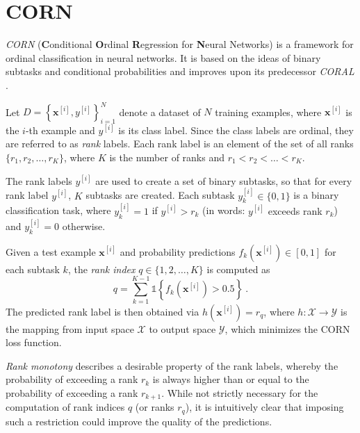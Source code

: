\section{CORN}
\emph{CORN} (\textbf{C}onditional \textbf{O}rdinal \textbf{R}egression for \textbf{N}eural Networks) \cite{corn}
is a framework for ordinal classification in neural networks.
It is based on the ideas of binary subtasks and conditional probabilities
and improves upon its predecessor \emph{CORAL} \cite{coral}.



Let $D = \left\{ \mathbf{x}^{[i]}, y^{[i]} \right\}_{i=1}^N$ denote a dataset of $N$ training examples,
where $\mathbf{x}^{[i]}$ is the $i$-th example and $y^{[i]}$ is its class label.
Since the class labels are ordinal, they are referred to as \emph{rank} labels.
Each rank label is an element of the set of all ranks $\{r_1, r_2, \ldots, r_K\}$,
  where
  $K$ is the number of ranks
  and $r_1 < r_2 < \ldots < r_K$.

The rank labels $y^{[i]}$ are used to create a set of binary subtasks,
so that for every rank label $y^{[i]}$,
$K$ subtasks are created.
Each subtask $y^{[i]}_k \in \{0, 1\}$ is a binary classification task,
  where
    $y^{[i]}_k = 1$ if $y^{[i]} > r_k$ (in words: {$y^{[i]}$ exceeds rank $r_k$})
    and $y^{[i]}_k = 0$ otherwise.

Given a test example $\mathbf{x}^{[i]}$
and probability predictions $f_k(\mathbf{x}^{[i]}) \in [0,1]$ for each subtask $k$,
the \emph{rank index} $q \in \{1, 2, \ldots, K\}$ is computed as
\begin{equation}
  q = \sum_{k=1}^{K-1} \mathbb{1}\left\{f_k(\mathbf{x}^{[i]}) > 0.5\right\} \ .
\end{equation}
The predicted rank label is then obtained via
$h(\mathbf{x}^{[i]}) = r_q$,
where $h: \mathcal{X} \to \mathcal{Y}$ is the mapping from input space $\mathcal{X}$ to output space $\mathcal{Y}$,
which minimizes the CORN loss function.


\emph{Rank monotony} describes a desirable property of the rank labels,
whereby the probability of exceeding a rank $r_k$ is always higher than or equal to the probability of exceeding a rank $r_{k+1}$.
%
While not strictly necessary for the computation of rank indices $q$ (or ranks $r_q$),
it is intuitively clear that imposing such a restriction could improve the quality of the predictions.

